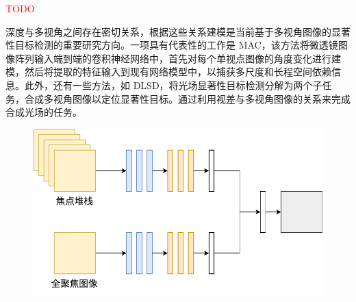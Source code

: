 \textcolor{red}{TODO}





深度与多视角之间存在密切关系，根据这些关系建模是当前基于多视角图像的显著性目标检测的重要研究方向。一项具有代表性的工作是 MAC，该方法将微透镜图像阵列输入端到端的卷积神经网络中，首先对每个单视点图像的角度变化进行建模，然后将提取的特征输入到现有网络模型中，以捕获多尺度和长程空间依赖信息。此外，还有一些方法，如 DLSD，将光场显著性目标检测分解为两个子任务，合成多视角图像以定位显著性目标。通过利用视差与多视角图像的关系来完成合成光场的任务。





%
%
\begin{figure}[!ht]
	\centering
	\includegraphics[width=0.80\linewidth]{figures/chapter2/model_of_fs_inputs}
	\label{cpt2_fig9:model_of_fs_inputs}
\end{figure}
%
%




